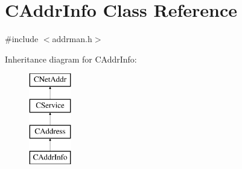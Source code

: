 \hypertarget{class_c_addr_info}{}\section{C\+Addr\+Info Class Reference}
\label{class_c_addr_info}


{\ttfamily \#include $<$addrman.\+h$>$}

Inheritance diagram for C\+Addr\+Info\+:\begin{figure}[H]
\begin{center}
\leavevmode
\includegraphics[height=4.000000cm]{class_c_addr_info}
\end{center}
\end{figure}
